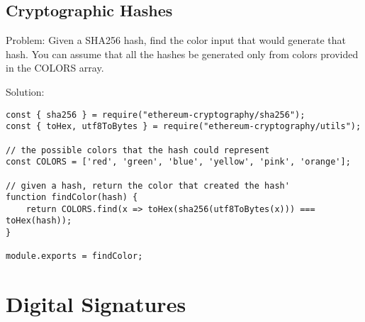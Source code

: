 \documentclass[a4paper, oneside]{book}
\begin{document}
\subsection{Cryptographic Hashes}

\textsf{Problem:} Given a SHA256 hash, find the color input that would generate that hash. You can assume that all the hashes be generated only from colors provided in the COLORS array.

\noindent \textsf{Solution:}

\begin{verbatim}
const { sha256 } = require("ethereum-cryptography/sha256");
const { toHex, utf8ToBytes } = require("ethereum-cryptography/utils");

// the possible colors that the hash could represent
const COLORS = ['red', 'green', 'blue', 'yellow', 'pink', 'orange'];

// given a hash, return the color that created the hash'
function findColor(hash) {
    return COLORS.find(x => toHex(sha256(utf8ToBytes(x))) === toHex(hash));
}

module.exports = findColor;
\end{verbatim}

\section{Digital Signatures}
\end{document}
